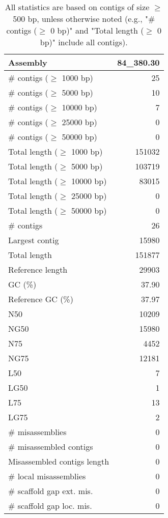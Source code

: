 \documentclass[12pt,a4paper]{article}
\begin{document}
\begin{table}[ht]
\begin{center}
\caption{All statistics are based on contigs of size $\geq$ 500 bp, unless otherwise noted (e.g., "\# contigs ($\geq$ 0 bp)" and "Total length ($\geq$ 0 bp)" include all contigs).}
\begin{tabular}{|l*{1}{|r}|}
\hline
Assembly & 84\_380.30 \\ \hline
\# contigs ($\geq$ 1000 bp) & 25 \\ \hline
\# contigs ($\geq$ 5000 bp) & 10 \\ \hline
\# contigs ($\geq$ 10000 bp) & 7 \\ \hline
\# contigs ($\geq$ 25000 bp) & 0 \\ \hline
\# contigs ($\geq$ 50000 bp) & 0 \\ \hline
Total length ($\geq$ 1000 bp) & 151032 \\ \hline
Total length ($\geq$ 5000 bp) & 103719 \\ \hline
Total length ($\geq$ 10000 bp) & 83015 \\ \hline
Total length ($\geq$ 25000 bp) & 0 \\ \hline
Total length ($\geq$ 50000 bp) & 0 \\ \hline
\# contigs & 26 \\ \hline
Largest contig & 15980 \\ \hline
Total length & 151877 \\ \hline
Reference length & 29903 \\ \hline
GC (\%) & 37.90 \\ \hline
Reference GC (\%) & 37.97 \\ \hline
N50 & 10209 \\ \hline
NG50 & 15980 \\ \hline
N75 & 4452 \\ \hline
NG75 & 12181 \\ \hline
L50 & 7 \\ \hline
LG50 & 1 \\ \hline
L75 & 13 \\ \hline
LG75 & 2 \\ \hline
\# misassemblies & 0 \\ \hline
\# misassembled contigs & 0 \\ \hline
Misassembled contigs length & 0 \\ \hline
\# local misassemblies & 0 \\ \hline
\# scaffold gap ext. mis. & 0 \\ \hline
\# scaffold gap loc. mis. & 0 \\ \hline

\end{tabular}
\end{center}
\end{table}
\end{document}
